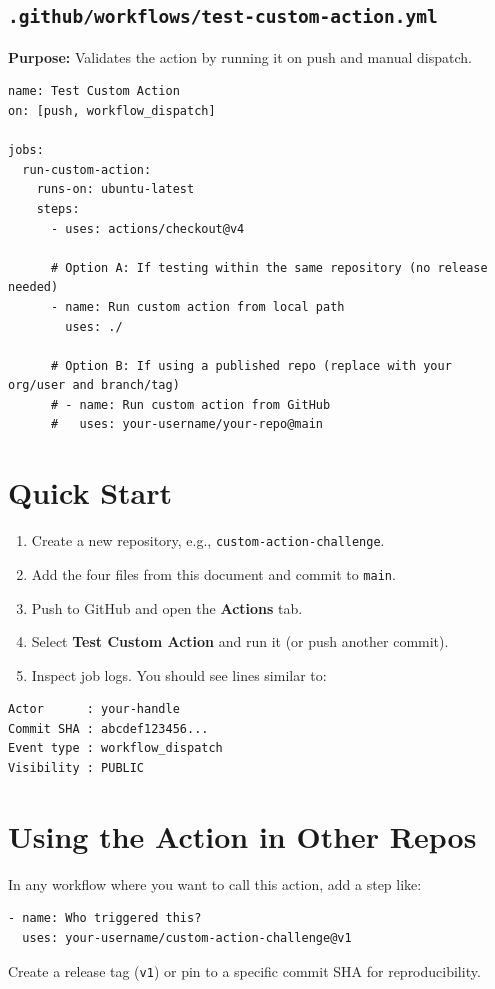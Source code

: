 \documentclass[11pt]{article}
\begin{document}
\subsection{\texttt{.github/workflows/test-custom-action.yml}}
\begin{tcolorbox}
\textbf{Purpose:} Validates the action by running it on push and manual dispatch.
\end{tcolorbox}
\begin{verbatim}
name: Test Custom Action
on: [push, workflow_dispatch]

jobs:
  run-custom-action:
    runs-on: ubuntu-latest
    steps:
      - uses: actions/checkout@v4

      # Option A: If testing within the same repository (no release needed)
      - name: Run custom action from local path
        uses: ./

      # Option B: If using a published repo (replace with your org/user and branch/tag)
      # - name: Run custom action from GitHub
      #   uses: your-username/your-repo@main
\end{verbatim}
\clearpage

\section{Quick Start}
\begin{enumerate}
  \item Create a new repository, e.g., \texttt{custom-action-challenge}.
  \item Add the four files from this document and commit to \texttt{main}.
  \item Push to GitHub and open the \textbf{Actions} tab.
  \item Select \textbf{Test Custom Action} and run it (or push another commit).
  \item Inspect job logs. You should see lines similar to:
\end{enumerate}

\begin{verbatim}
Actor      : your-handle
Commit SHA : abcdef123456...
Event type : workflow_dispatch
Visibility : PUBLIC
\end{verbatim}

\section{Using the Action in Other Repos}
In any workflow where you want to call this action, add a step like:
\begin{verbatim}
- name: Who triggered this?
  uses: your-username/custom-action-challenge@v1
\end{verbatim}
Create a release tag (\texttt{v1}) or pin to a specific commit SHA for reproducibility.
\end{document}
